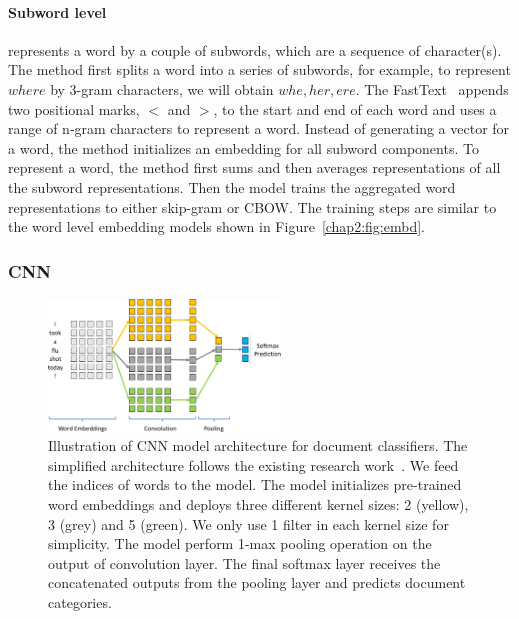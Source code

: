 
\paragraph{Subword level} represents a word by a couple of subwords, which are a sequence of character(s).
The method first splits a word into a series of subwords, for example, to represent $where$ by 3-gram characters, we will obtain $whe, her, ere$.
The FastText~\cite{bojanowski2017enriching} appends two positional marks, $<$ and $>$, to the start and end of each word and uses a range of n-gram characters to represent a word. 
Instead of generating a vector for a word, the method initializes an embedding for all subword components.
To represent a word, the method first sums and then averages representations of all the subword representations.
Then the model trains the aggregated word representations to either skip-gram or CBOW.
The training steps are similar to the word level embedding models shown in Figure~\ref{chap2:fig:embd}.


\subsubsection{CNN}

\begin{figure}[htp]
\centering
\includegraphics[width=0.55\textwidth]{images/chapter2/cnn.pdf}
\caption{Illustration of CNN model architecture for document classifiers. The simplified architecture follows the existing research work~\cite{kim2014convolutional}. We feed the indices of words to the model. The model initializes pre-trained word embeddings and deploys three different kernel sizes: 2 (yellow), 3 (grey) and 5 (green). We only use 1 filter in each kernel size for simplicity. The model perform 1-max pooling operation on the output of convolution layer. The final softmax layer receives the concatenated outputs from the pooling layer and predicts document categories.}
\label{chap2:fig:cnn}
\end{figure}

